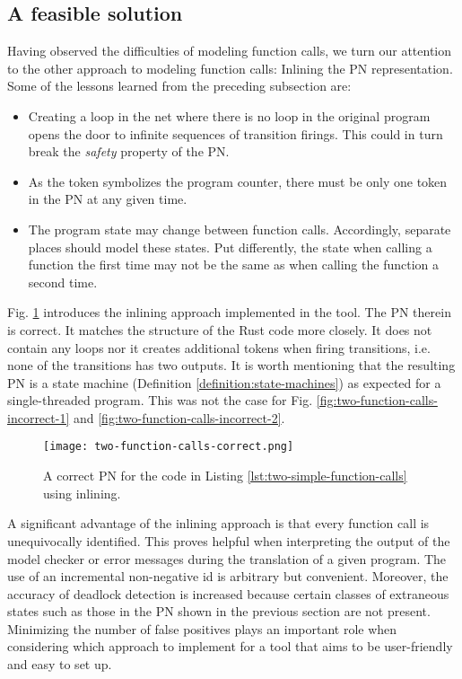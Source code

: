 \documentclass[../Thesis.tex]{subfiles}
\begin{document}
\clearpage
\subsection{A feasible solution}

Having observed the difficulties of modeling function calls,
we turn our attention to the other approach to modeling function calls:
Inlining the \acrshort{PN} representation.
Some of the lessons learned from the preceding subsection are:

\begin{itemize}
    \item Creating a loop in the net where there is no loop in the original program
          opens the door to infinite sequences of transition firings.
          This could in turn break the \emph{safety} property of the \acrshort{PN}.
    \item As the token symbolizes the program counter,
          there must be only one token in the \acrshort{PN} at any given time.
    \item The program state may change between function calls.
          Accordingly, separate places should model these states.
          Put differently, the state when calling a function the first time
          may not be the same as when calling the function a second time.
\end{itemize}

Fig. \ref{fig:two-function-calls-correct} introduces
the inlining approach implemented in the tool.
The \acrshort{PN} therein is correct.
It matches the structure of the Rust code more closely.
It does not contain any loops nor
it creates additional tokens when firing transitions,
i.e. none of the transitions has two outputs.
It is worth mentioning that the resulting \acrshort{PN} is a state machine
(Definition \ref{definition:state-machines})
as expected for a single-threaded program.
This was not the case for Fig. \ref{fig:two-function-calls-incorrect-1}
and \ref{fig:two-function-calls-incorrect-2}.

\begin{figure}[!htb]
    \centering
    \texttt{[image: two-function-calls-correct.png]}
    \caption{A correct \acrshort{PN} for the code
        in Listing \ref{lst:two-simple-function-calls} using inlining.}
    \label{fig:two-function-calls-correct}
\end{figure}

A significant advantage of the inlining approach is
that every function call is unequivocally identified.
This proves helpful when interpreting the output of the model checker or
error messages during the translation of a given program.
The use of an incremental non-negative id is arbitrary but convenient.
Moreover, the accuracy of deadlock detection is increased because
certain classes of extraneous states
such as those in the \acrshort{PN} shown in the previous section
are not present.
Minimizing the number of false positives plays an important role
when considering which approach to implement
for a tool that aims to be user-friendly and easy to set up.
\end{document}
